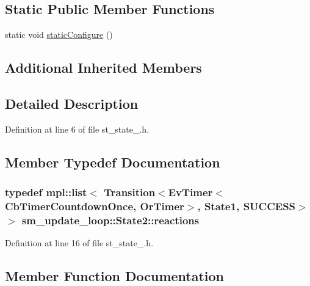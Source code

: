 \subsection*{Static Public Member Functions}
\begin{DoxyCompactItemize}
\item 
static void \hyperlink{structsm__update__loop_1_1State2_a1def7d74eb295ef6fdfdd122affa921d}{static\+Configure} ()
\end{DoxyCompactItemize}
\subsection*{Additional Inherited Members}


\subsection{Detailed Description}


Definition at line 6 of file st\+\_\+state\+\_.\+h.



\subsection{Member Typedef Documentation}
\subsubsection[{\texorpdfstring{reactions}{reactions}}]{\setlength{\rightskip}{0pt plus 5cm}typedef mpl\+::list$<$ Transition$<${\bf Ev\+Timer}$<${\bf Cb\+Timer\+Countdown\+Once}, {\bf Or\+Timer}$>$, {\bf State1}, {\bf S\+U\+C\+C\+E\+SS}$>$ $>$ {\bf sm\+\_\+update\+\_\+loop\+::\+State2\+::reactions}}\hypertarget{structsm__update__loop_1_1State2_a568e8e1054b11a61f72133866608b392}{}\label{structsm__update__loop_1_1State2_a568e8e1054b11a61f72133866608b392}


Definition at line 16 of file st\+\_\+state\+\_.\+h.



\subsection{Member Function Documentation}
